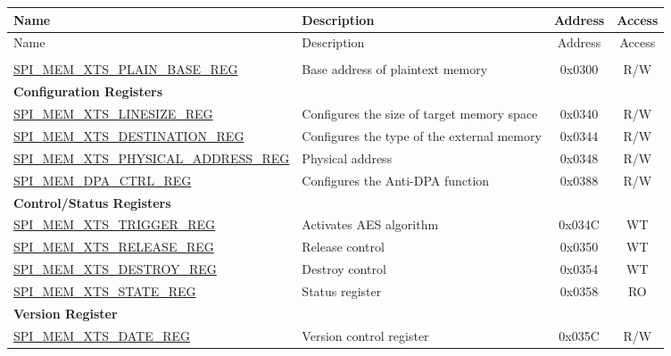 \begin{longtable}{ | p{6.0cm} | p{6.6cm} | c | c| }
\hline\rowcolor{lightgray}
Name & Description & Address & Access \\ \hline
\endfirsthead
\hline
\rowcolor{lightgray}
Name & Description & Address & Access  \\
\hline
\endhead
\endfoot

\multicolumn{4}{|l|}{\textbf{Plaintext Register Heap}} \\\hline
\hyperref[regdesc:SPIMEMXTSPLAINBASEREG]{SPI\_MEM\_XTS\_PLAIN\_BASE\_REG}  & Base address of plaintext memory   & 0x0300 & R/W \\\hline
\multicolumn{4}{|l|}{\textbf{Configuration Registers}} \\ \hline
\hyperref[regdesc:SPIMEMXTSLINESIZEREG]{SPI\_MEM\_XTS\_LINESIZE\_REG}  & Configures the size of target memory space & 0x0340 & R/W \\\hline
\hyperref[regdesc:SPIMEMXTSDESTINATIONREG]{SPI\_MEM\_XTS\_DESTINATION\_REG}  & Configures the type of the external memory   & 0x0344 & R/W \\\hline
\hyperref[regdesc:SPIMEMXTSPHYSICALADDRESSREG]{SPI\_MEM\_XTS\_PHYSICAL\_ADDRESS\_REG}  & Physical address   & 0x0348 & R/W \\\hline
\hyperref[regdesc:SPIMEMDPACTRLREG]{SPI\_MEM\_DPA\_CTRL\_REG}  & Configures the Anti-DPA function       & 0x0388 & R/W \\\hline
\multicolumn{4}{|l|}{\textbf{Control/Status Registers}} \\ \hline
\hyperref[regdesc:SPIMEMXTSTRIGGERREG]{SPI\_MEM\_XTS\_TRIGGER\_REG}  & Activates AES algorithm         & 0x034C & WT \\\hline
\hyperref[regdesc:SPIMEMXTSRELEASEREG]{SPI\_MEM\_XTS\_RELEASE\_REG}  & Release control         & 0x0350 & WT \\\hline
\hyperref[regdesc:SPIMEMXTSDESTROYREG]{SPI\_MEM\_XTS\_DESTROY\_REG}  & Destroy control         & 0x0354 & WT \\\hline
\hyperref[regdesc:SPIMEMXTSSTATEREG]{SPI\_MEM\_XTS\_STATE\_REG}  & Status register       & 0x0358 & RO \\\hline
\multicolumn{4}{|l|}{\textbf{Version Register}} \\ \hline
\hyperref[regdesc:SPIMEMXTSDATEREG]{SPI\_MEM\_XTS\_DATE\_REG}  & Version control register   & 0x035C & R/W \\\hline

\end{longtable}

